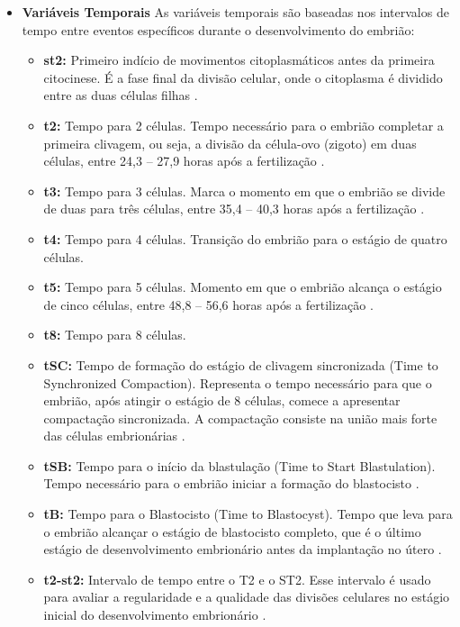 \begin{apendicesenv}
\begin{itemize}
  \item \textbf{Variáveis Temporais}
  As variáveis temporais são baseadas nos intervalos de tempo entre eventos específicos durante o desenvolvimento do embrião:
  \begin{itemize}
    \item \textbf{st2:} Primeiro indício de movimentos citoplasmáticos antes da primeira citocinese. É a fase final da divisão celular, onde o citoplasma é dividido entre as duas células filhas \cite{ramalho2024}.
    \item \textbf{t2:} Tempo para 2 células. Tempo necessário para o embrião completar a primeira clivagem, ou seja, a divisão da célula-ovo (zigoto) em duas células, entre 24,3 – 27,9 horas após a fertilização \cite{cruz2012}.
    \item \textbf{t3:} Tempo para 3 células. Marca o momento em que o embrião se divide de duas para três células, entre 35,4 – 40,3 horas após a fertilização \cite{cruz2012}.
    \item \textbf{t4:} Tempo para 4 células. Transição do embrião para o estágio de quatro células.
    \item \textbf{t5:} Tempo para 5 células. Momento em que o embrião alcança o estágio de cinco células, entre 48,8 – 56,6 horas após a fertilização \cite{cruz2012}.
    \item \textbf{t8:} Tempo para 8 células.
    \item \textbf{tSC:} Tempo de formação do estágio de clivagem sincronizada (Time to Synchronized Compaction). Representa o tempo necessário para que o embrião, após atingir o estágio de 8 células, comece a apresentar compactação sincronizada. A compactação consiste na união mais forte das células embrionárias \cite{kato2021}.
    \item \textbf{tSB:} Tempo para o início da blastulação (Time to Start Blastulation). Tempo necessário para o embrião iniciar a formação do blastocisto \cite{kato2021}.
    \item \textbf{tB:} Tempo para o Blastocisto (Time to Blastocyst). Tempo que leva para o embrião alcançar o estágio de blastocisto completo, que é o último estágio de desenvolvimento embrionário antes da implantação no útero \cite{yuan2023}.
    \item \textbf{t2-st2:} Intervalo de tempo entre o T2 e o ST2. Esse intervalo é usado para avaliar a regularidade e a qualidade das divisões celulares no estágio inicial do desenvolvimento embrionário \cite{ramalho2024}.

\end{itemize}
\end{itemize}
\end{apendicesenv}
